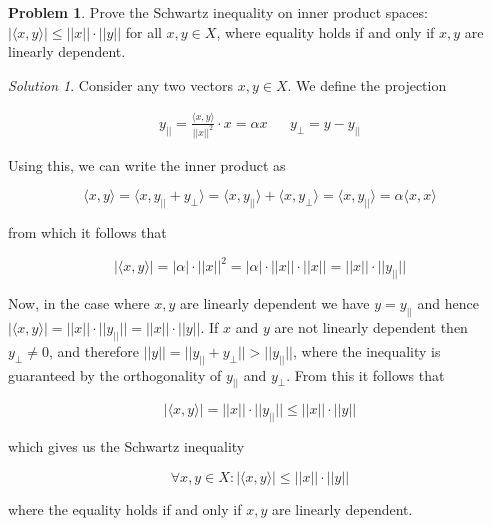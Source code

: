 \documentclass[12pt,a4paper]{article}
\theoremstyle{definition}
\newtheorem{problem}{Problem}
\theoremstyle{remark}
\newtheorem*{solution}{Solution}
\begin{document}
\begin{problem}
    Prove the Schwartz inequality on inner product spaces: $|\langle x, y \rangle| \le ||x|| \cdot ||y||$ for all $x, y \in X$, where equality holds if and only if $x, y$ are linearly dependent.
\end{problem}
\begin{solution}
    Consider any two vectors $x, y \in X$. We define the projection

    \begin{align*}
        y_{||} = \frac{\langle x, y \rangle}{||x||^2} \cdot x = \alpha x && y_{\perp} = y-y_{||}
    \end{align*}
    
    Using this, we can write the inner product as

    $$\langle x, y \rangle = \langle x, y_{||} + y_{\perp} \rangle = \langle x, y_{||} \rangle + \langle x, y_{\perp} \rangle = \langle x, y_{||} \rangle = \alpha \langle x, x \rangle$$

    from which it follows that

    $$|\langle x, y \rangle | = |\alpha| \cdot ||x||^2 = |\alpha | \cdot ||x|| \cdot ||x|| = ||x|| \cdot ||y_{||}||$$

    Now, in the case where $x, y$ are linearly dependent we have $y = y_{||}$ and hence $|\langle x, y \rangle | = ||x|| \cdot ||y_{||}|| = ||x|| \cdot ||y||$. If $x$ and $y$ are not linearly dependent then $y_{\perp} \ne 0$, and therefore $||y|| = ||y_{||} + y_{\perp}|| > ||y_{||}||$, where the inequality is guaranteed by the orthogonality of $y_{||}$ and $y_{\perp}$. From this it follows that 

    $$|\langle x, y \rangle | = ||x|| \cdot ||y_{||}|| \le ||x|| \cdot ||y||$$

    which gives us the Schwartz inequality 

    $$\forall x, y \in X: |\langle x, y \rangle | \le ||x|| \cdot ||y||$$

    where the equality holds if and only if $x,y$ are linearly dependent.
\end{solution}
\end{document}
